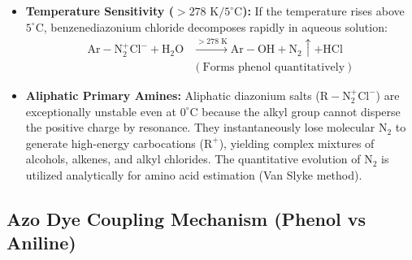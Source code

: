\documentclass[10pt,twoside,openright]{book}
\begin{document}
\begin{trapbox}
\begin{itemize}
  \item \textbf{Temperature Sensitivity ($> 278\text{ K} / 5^\circ\mathrm{C}$):} If the temperature rises above $5^\circ\mathrm{C}$, benzenediazonium chloride decomposes rapidly in aqueous solution:
  \begin{align}
    \mathrm{Ar-N_2^+Cl^-} + \mathrm{H_2O} &\xrightarrow{> 278\text{ K}} \mathrm{Ar-OH} + \mathrm{N_2}\uparrow + \mathrm{HCl} \\
    &(\text{Forms phenol quantitatively})
  \end{align}
  \item \textbf{Aliphatic Primary Amines:} Aliphatic diazonium salts ($\mathrm{R-N_2^+Cl^-}$) are exceptionally unstable even at $0^\circ\mathrm{C}$ because the alkyl group cannot disperse the positive charge by resonance. They instantaneously lose molecular $\mathrm{N_2}$ to generate high-energy carbocations ($\mathrm{R^+}$), yielding complex mixtures of alcohols, alkenes, and alkyl chlorides. The quantitative evolution of $\mathrm{N_2}$ is utilized analytically for amino acid estimation (Van Slyke method).
\end{itemize}
\end{trapbox}

\subsection{Azo Dye Coupling Mechanism (Phenol vs Aniline)}
\end{document}
